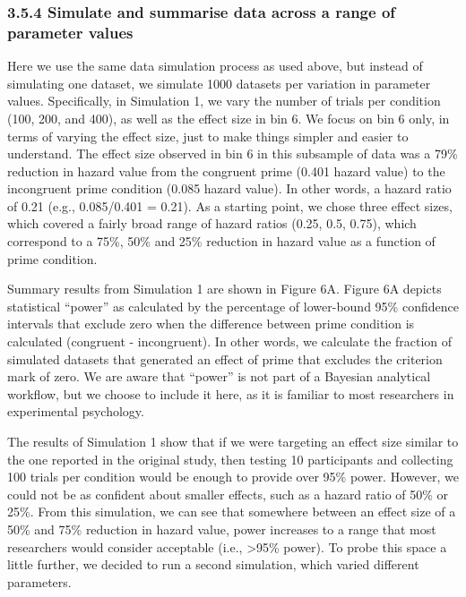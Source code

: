\documentclass[
  english,
  man, donotrepeattitle,floatsintext]{apa6}
\begin{document}
\subsubsection{3.5.4 Simulate and summarise data across a range of parameter values}\label{simulate-and-summarise-data-across-a-range-of-parameter-values}

Here we use the same data simulation process as used above, but instead of simulating one dataset, we simulate 1000 datasets per variation in parameter values.
Specifically, in Simulation 1, we vary the number of trials per condition (100, 200, and 400), as well as the effect size in bin 6.
We focus on bin 6 only, in terms of varying the effect size, just to make things simpler and easier to understand.
The effect size observed in bin 6 in this subsample of data was a 79\% reduction in hazard value from the congruent prime (0.401 hazard value) to the incongruent prime condition (0.085 hazard value). In other words, a hazard ratio of 0.21 (e.g., 0.085/0.401 = 0.21).
As a starting point, we chose three effect sizes, which covered a fairly broad range of hazard ratios (0.25, 0.5, 0.75), which correspond to a 75\%, 50\% and 25\% reduction in hazard value as a function of prime condition.

Summary results from Simulation 1 are shown in Figure 6A.
Figure 6A depicts statistical ``power'' as calculated by the percentage of lower-bound 95\% confidence intervals that exclude zero when the difference between prime condition is calculated (congruent - incongruent).
In other words, we calculate the fraction of simulated datasets that generated an effect of prime that excludes the criterion mark of zero.
We are aware that ``power'' is not part of a Bayesian analytical workflow, but we choose to include it here, as it is familiar to most researchers in experimental psychology.

The results of Simulation 1 show that if we were targeting an effect size similar to the one reported in the original study, then testing 10 participants and collecting 100 trials per condition would be enough to provide over 95\% power.
However, we could not be as confident about smaller effects, such as a hazard ratio of 50\% or 25\%.
From this simulation, we can see that somewhere between an effect size of a 50\% and 75\% reduction in hazard value, power increases to a range that most researchers would consider acceptable (i.e., \textgreater95\% power).
To probe this space a little further, we decided to run a second simulation, which varied different parameters.
\end{document}
